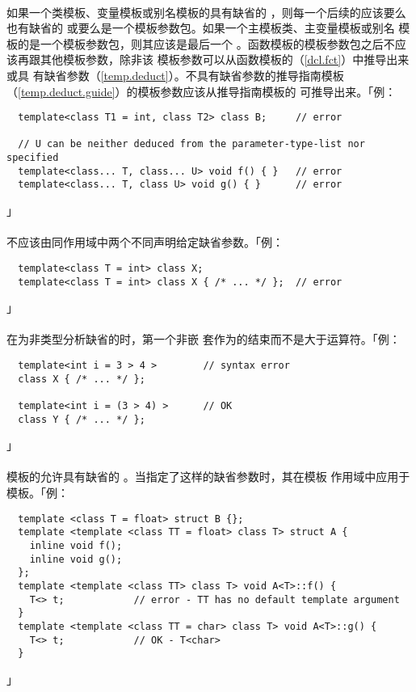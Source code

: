 \paragraph{}
如果一个类模板、变量模板或别名模板的具有缺省的
，则每一个后续的应该要么也有缺省的
或要么是一个模板参数包。如果一个主模板类、主变量模板或别名
模板的是一个模板参数包，则其应该是最后一个
。函数模板的模板参数包之后不应该再跟其他模板参数，除非该
模板参数可以从函数模板的（\ref{dcl.fct}）中推导出来或具
有缺省参数（\ref{temp.deduct}）。不具有缺省参数的推导指南模板
（\ref{temp.deduct.guide}）的模板参数应该从推导指南模板的
可推导出来。「例：
\begin{lstlisting}
  template<class T1 = int, class T2> class B;     // error

  // U can be neither deduced from the parameter-type-list nor specified
  template<class... T, class... U> void f() { }   // error
  template<class... T, class U> void g() { }      // error
\end{lstlisting}」

\paragraph{}
不应该由同作用域中两个不同声明给定缺省参数。「例：
\begin{lstlisting}
  template<class T = int> class X;
  template<class T = int> class X { /* ... */ };  // error
\end{lstlisting}」

\paragraph{}
在为非类型分析缺省的时，第一个非嵌
套\tm{>}作为的结束而不是大于运算符。「例：
\begin{lstlisting}
  template<int i = 3 > 4 >        // syntax error
  class X { /* ... */ };

  template<int i = (3 > 4) >      // OK
  class Y { /* ... */ };
\end{lstlisting}」

\paragraph{}
模板的允许具有缺省的
。当指定了这样的缺省参数时，其在模板
作用域中应用于模板。「例：
\begin{lstlisting}
  template <class T = float> struct B {};
  template <template <class TT = float> class T> struct A {
    inline void f();
    inline void g();
  };
  template <template <class TT> class T> void A<T>::f() {
    T<> t;            // error - TT has no default template argument
  }
  template <template <class TT = char> class T> void A<T>::g() {
    T<> t;            // OK - T<char>
  }
\end{lstlisting}」

